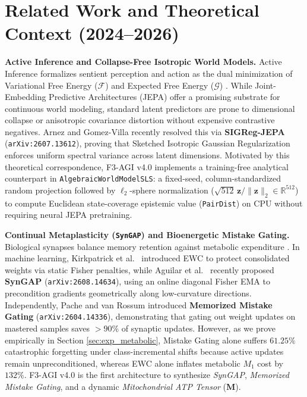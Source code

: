 \documentclass[10pt,a4paper]{article}
\begin{document}
\section{Related Work and Theoretical Context (2024--2026)}

\textbf{Active Inference and Collapse-Free Isotropic World Models.}
Active Inference formalizes sentient perception and action as the dual minimization of Variational Free Energy ($\mathcal{F}$) and Expected Free Energy ($\mathcal{G}$) \cite{friston2010free,friston2017active}. While Joint-Embedding Predictive Architectures (JEPA) offer a promising substrate for continuous world modeling, standard latent predictors are prone to dimensional collapse or anisotropic covariance distortion without expensive contrastive negatives. Arnez and Gomez-Villa \cite{balestriero2025lejepa,arnez2026sigreg} recently resolved this via \textbf{SIGReg-JEPA} (\texttt{arXiv:2607.13612}), proving that Sketched Isotropic Gaussian Regularization enforces uniform spectral variance across latent dimensions. Motivated by this theoretical correspondence, F3-AGI v4.0 implements a training-free analytical counterpart in \texttt{AlgebraicWorldModelSLS}: a fixed-seed, column-standardized random projection followed by $\ell_2$-sphere normalization ($\sqrt{512}\,\mathbf{z}/\|\mathbf{z}\|_2 \in \mathbb{R}^{512}$) to compute Euclidean state-coverage epistemic value (\texttt{PairDist}) on CPU without requiring neural JEPA pretraining.

\textbf{Continual Metaplasticity (\texttt{SynGAP}) and Bioenergetic Mistake Gating.}
Biological synapses balance memory retention against metabolic expenditure \cite{zainal2024syngap,vanrossum2025mistake}. In machine learning, Kirkpatrick et al.\ \cite{kirkpatrick2017overcoming} introduced EWC to protect consolidated weights via static Fisher penalties, while Aguilar et al.\ \cite{zainal2024syngap} recently proposed \textbf{SynGAP} (\texttt{arXiv:2608.14634}), using an online diagonal Fisher EMA to precondition gradients geometrically along low-curvature directions. Independently, Pache and van Rossum \cite{vanrossum2025mistake} introduced \textbf{Memorized Mistake Gating} (\texttt{arXiv:2604.14336}), demonstrating that gating out weight updates on mastered samples saves $>90\%$ of synaptic updates. However, as we prove empirically in Section \ref{sec:exp_metabolic}, Mistake Gating alone suffers $61.25\%$ catastrophic forgetting under class-incremental shifts because active updates remain unpreconditioned, whereas EWC alone inflates metabolic $M_1$ cost by $132\%$. F3-AGI v4.0 is the first architecture to synthesize \emph{SynGAP}, \emph{Memorized Mistake Gating}, and a dynamic \emph{Mitochondrial ATP Tensor} ($\mathbf{M}$).
\end{document}
